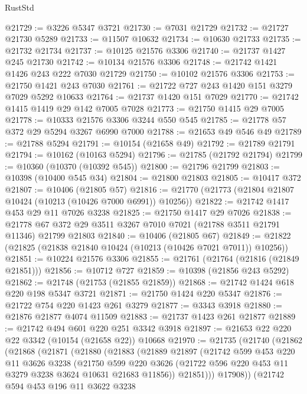 \begin{lexlean}{RustStd}
\begin{coremodule}
@21729 := @3226 @5347 @3721
@21730 := @7031 @21729
@21732 := @21727 @21730 @5289
@21733 := @11507 @10632
@21734 := @10630 @21733
@21735 := @21732 @21734
@21737 := @10125 @21576 @3306
@21740 := @21737 @1427 @245 @21730
@21742 := @10134 @21576 @3306
@21748 := @21742 @1421 @1426 @243 @222 @7030 @21729
@21750 := @10102 @21576 @3306
@21753 := @21750 @1421 @243 @7030
@21761 := @21722 @727 @243 @1420 @151 @3279 @7029 @5292 @10633
@21764 := @21737 @1420 @151 @7029
@21770 := @21742 @1415 @1419 @29 @142 @7005 @7028
@21773 := @21750 @1415 @29 @7005
@21778 := @10333 @21576 @3306 @3244 @550 @545
@21785 := @21778 @57 @372 @29 @5294 @3267 @6990 @7000
@21788 := @21653 @49 @546 @49
@21789 := @21788 @5294
@21791 := @10154 (@21658 @49)
@21792 := @21789 @21791
@21794 := @10162 (@10163 @5294)
@21796 := @21785 (@21792 @21794)
@21799 := @10360 (@10370 (@10392 @545))
@21800 := @21796 @21799
@21803 := @10398 (@10400 @545 @34)
@21804 := @21800 @21803
@21805 := @10417 @372
@21807 := @10406 (@21805 @57)
@21816 := @21770 (@21773 (@21804 @21807 @10424 (@10213 (@10426 @7000 @6991)) @10256))
@21822 := @21742 @1417 @453 @29 @11 @7026 @3238
@21825 := @21750 @1417 @29 @7026
@21838 := @21778 @67 @372 @29 @3511 @3267 @7010 @7021 (@21788 @3511 @21791 @11346) @21799 @21803
@21840 := @10406 (@21805 @67)
@21849 := @21822 (@21825 (@21838 @21840 @10424 (@10213 (@10426 @7021 @7011)) @10256))
@21851 := @10224 @21576 @3306
@21855 := @21761 (@21764 (@21816 (@21849 @21851)))
@21856 := @10712 @727
@21859 := @10398 (@21856 @243 @5292)
@21862 := @21748 (@21753 (@21855 @21859))
@21868 := @21742 @1424 @618 @220 @198 @5347 @3721
@21871 := @21750 @1424 @220 @5347
@21876 := @21722 @754 @220 @1423 @261 @3279
@21877 := @3343 @3918
@21880 := @21876 @21877 @4074 @11509
@21883 := @21737 @1423 @261 @21877
@21889 := @21742 @494 @601 @220 @251 @3342 @3918
@21897 := @21653 @22 @220 @22 @3342 (@10154 (@21658 @22)) @10668
@21970 := @21735
    (@21740
      (@21862
        (@21868
          (@21871
            (@21880
              (@21883
                (@21889
                  @21897
                  (@21742
                    @599
                    @453
                    @220
                    @11
                    @3626
                    @3238
                    (@21750
                      @599
                      @220
                      @3626
                      (@21722 @596 @220 @453 @11 @3279 @3238 @3624 @10631 @21683 @11856))
                    @21851)))
              @17908))
          (@21742
            @594
            @453
            @196
            @11
            @3622
            @3238

\end{coremodule}
\end{lexlean}
